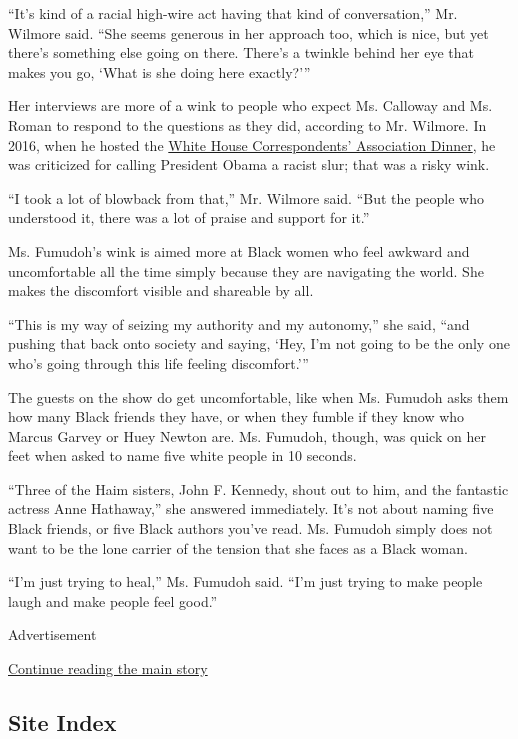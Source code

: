 ``It's kind of a racial high-wire act having that kind of
conversation,'' Mr. Wilmore said. ``She seems generous in her approach
too, which is nice, but yet there's something else going on there.
There's a twinkle behind her eye that makes you go, `What is she doing
here exactly?'''

Her interviews are more of a wink to people who expect Ms. Calloway and
Ms. Roman to respond to the questions as they did, according to Mr.
Wilmore. In 2016, when he hosted the
\href{https://www.youtube.com/watch?v=1IDFt3BL7FA}{White House
Correspondents' Association Dinner}, he was criticized for calling
President Obama a racist slur; that was a risky wink.

``I took a lot of blowback from that,'' Mr. Wilmore said. ``But the
people who understood it, there was a lot of praise and support for
it.''

Ms. Fumudoh's wink is aimed more at Black women who feel awkward and
uncomfortable all the time simply because they are navigating the world.
She makes the discomfort visible and shareable by all.

``This is my way of seizing my authority and my autonomy,'' she said,
``and pushing that back onto society and saying, `Hey, I'm not going to
be the only one who's going through this life feeling discomfort.'''

The guests on the show do get uncomfortable, like when Ms. Fumudoh asks
them how many Black friends they have, or when they fumble if they know
who Marcus Garvey or Huey Newton are. Ms. Fumudoh, though, was quick on
her feet when asked to name five white people in 10 seconds.

``Three of the Haim sisters, John F. Kennedy, shout out to him, and the
fantastic actress Anne Hathaway,'' she answered immediately. It's not
about naming five Black friends, or five Black authors you've read. Ms.
Fumudoh simply does not want to be the lone carrier of the tension that
she faces as a Black woman.

``I'm just trying to heal,'' Ms. Fumudoh said. ``I'm just trying to make
people laugh and make people feel good.''

Advertisement

\protect\hyperlink{after-bottom}{Continue reading the main story}

\hypertarget{site-index}{%
\subsection{Site Index}\label{site-index}}

